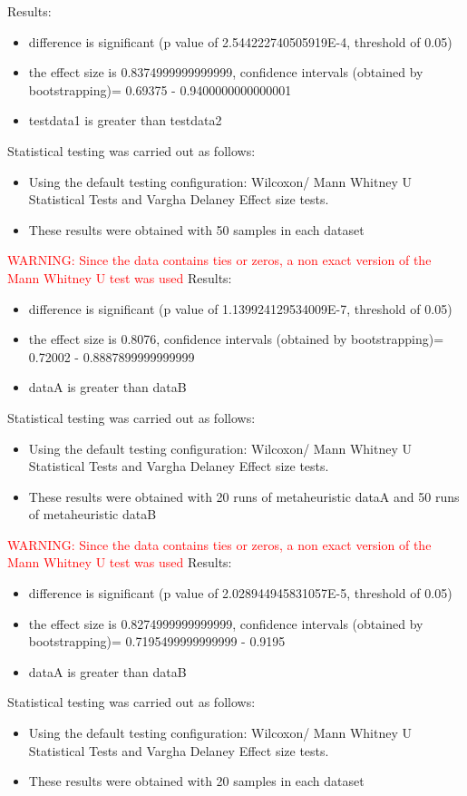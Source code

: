 \documentclass[]{article}
\begin{document}
Results:
\begin{itemize}
\item{difference is significant (p value of 2.544222740505919E-4, threshold of 0.05)}
\item{the effect size is 0.8374999999999999, confidence intervals (obtained by bootstrapping)= 0.69375 - 0.9400000000000001}
\item{testdata1 is greater than testdata2}
\end{itemize}Statistical testing was carried out as follows: \begin{itemize}
\item{Using the default testing configuration: Wilcoxon/ Mann Whitney U Statistical Tests and Vargha Delaney Effect size tests.}
\item{These results were obtained with 50 samples in each dataset}
\end{itemize}
\textcolor{Red}{WARNING: Since the data contains ties or zeros, a non exact version of the Mann Whitney U test was used}
Results:
\begin{itemize}
\item{difference is significant (p value of 1.139924129534009E-7, threshold of 0.05)}
\item{the effect size is 0.8076, confidence intervals (obtained by bootstrapping)= 0.72002 - 0.8887899999999999}
\item{dataA is greater than dataB}
\end{itemize}Statistical testing was carried out as follows: \begin{itemize}
\item{Using the default testing configuration: Wilcoxon/ Mann Whitney U Statistical Tests and Vargha Delaney Effect size tests.}
\item{These results were obtained with 20 runs of metaheuristic dataA and 50 runs of metaheuristic dataB}
\end{itemize}
\textcolor{Red}{WARNING: Since the data contains ties or zeros, a non exact version of the Mann Whitney U test was used}
Results:
\begin{itemize}
\item{difference is significant (p value of 2.028944945831057E-5, threshold of 0.05)}
\item{the effect size is 0.8274999999999999, confidence intervals (obtained by bootstrapping)= 0.7195499999999999 - 0.9195}
\item{dataA is greater than dataB}
\end{itemize}Statistical testing was carried out as follows: \begin{itemize}
\item{Using the default testing configuration: Wilcoxon/ Mann Whitney U Statistical Tests and Vargha Delaney Effect size tests.}
\item{These results were obtained with 20 samples in each dataset}
\end{itemize}
\end{document}

